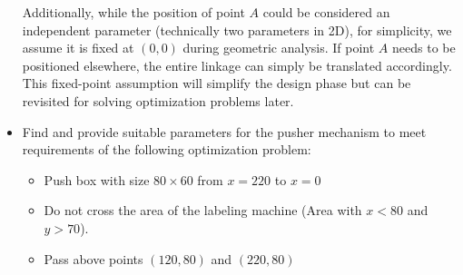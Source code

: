 \documentclass{article}
\begin{document}
\begin{itemize}
	Additionally, while the position of point $A$ could be considered an independent parameter (technically two parameters in 2D), for simplicity, we assume it is fixed at $(0, 0)$ during geometric analysis. If point $A$ needs to be positioned elsewhere, the entire linkage can simply be translated accordingly. This fixed-point assumption will simplify the design phase but can be revisited for solving optimization problems later.
	
	\item Find and provide suitable parameters for the pusher mechanism to meet requirements of the following optimization problem:
	\begin{itemize}
		\item Push box with size $80\times60$ from $x=220$ to $x=0$
		\item Do not cross the area of the labeling machine (Area with $x<80$ and $y>70$).
		\item Pass above points $(120, 80)$ and $(220, 80)$
	\end{itemize}
\end{itemize}
\end{document}
